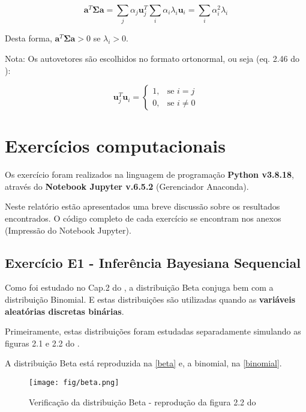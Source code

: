 \documentclass{article}
\begin{document}
   \[
   \mathbf{a}^{T}\boldsymbol{\Sigma} \mathbf{a} = \sum_{j} \alpha_{j}\mathbf{u}^{T}_{j} \sum_{i} \alpha_{i}\lambda_{i}\mathbf{u}_{i} = \sum_{i} \alpha^{2}_{i}\lambda_{i}
   \]
   
   
   
   Desta forma, $ \mathbf{a}^{T}\boldsymbol{\Sigma} \mathbf{a} > 0$ se $\lambda_{i} >0$. 
   
   
   Nota: Os autovetores são escolhidos no formato ortonormal, ou seja (eq. 2.46 do \cite{Bishop2006}):
      
   \[
   \mathbf{u}^{T}_{j} \mathbf{u}_{i}=
   \begin{cases} 
   	1, & \text{se } i = j \\
   	0, & \text{se } i \neq 0
   \end{cases}
   \]

\section{Exerc\'icios computacionais}

 Os exercício foram realizados na linguagem de programação \textbf{Python v3.8.18}, através do \textbf{Notebook Jupyter v.6.5.2} (Gerenciador Anaconda).
 
 Neste relatório estão apresentados uma breve discussão sobre os resultados encontrados. O código completo de cada exercício se encontram nos anexos (Impressão do Notebook Jupyter). 

 \subsection{ Exerc\'icio E1 - Infer\^encia Bayesiana Sequencial}
 
  Como foi estudado no Cap.2 do \cite{Bishop2006}, a distribuição Beta conjuga bem com a distribuição Binomial.  E estas distribuições são utilizadas quando as \textbf{variáveis aleatórias discretas binárias}.
  
  Primeiramente, estas distribuições foram estudadas separadamente simulando as figuras 2.1 e 2.2 do \cite{Bishop2006}.
  
  A distribuição Beta está reproduzida na \autoref{beta} e, a binomial, na \autoref{binomial}.
  
  \begin{figure}[ht]
  	\centering %
  	\texttt{[image: fig/beta.png]} %
  	\caption{Verificação da distribuição Beta - reprodução da figura 2.2 do \cite{Bishop2006}} %
  	\label{beta} %
  \end{figure} 
  
\end{document}

